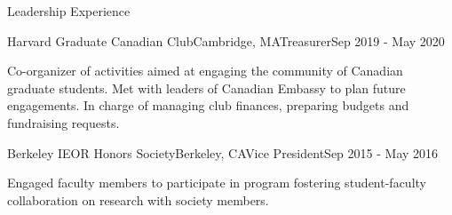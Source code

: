 \documentclass{resume} %
\begin{document}
\begin{rSection}{Leadership Experience}

\begin{rSubsection}{Harvard Graduate Canadian Club}{Cambridge, MA}{Treasurer}{Sep 2019 - May 2020}

\item Co-organizer of activities aimed at engaging the community of Canadian graduate students. Met with leaders of Canadian Embassy to plan future engagements. In charge of managing club finances, preparing budgets and fundraising requests.

\end{rSubsection}

\begin{rSubsection}{Berkeley IEOR Honors Society}{Berkeley, CA}{Vice President}{Sep 2015 - May 2016}

\item Engaged faculty members to participate in program fostering student-faculty collaboration on research with society members.

\end{rSubsection}




\end{rSection}

\end{document}
